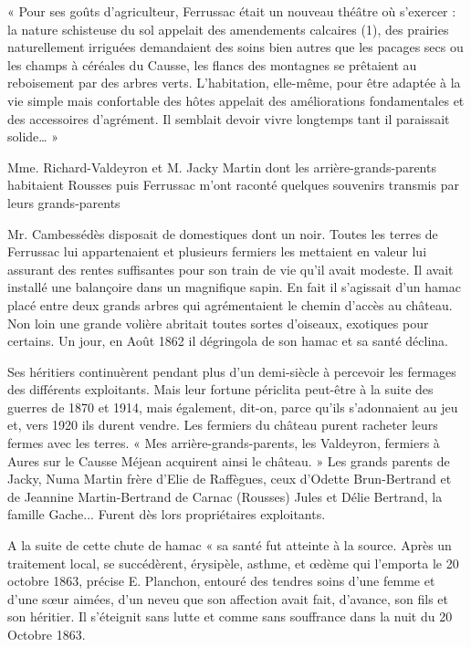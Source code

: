 
« Pour ses goûts d’agriculteur, Ferrussac était un nouveau théâtre où s’exercer : la nature
schisteuse du sol appelait des amendements calcaires (1), des prairies naturellement irriguées
demandaient des soins bien autres que les pacages secs ou les champs à céréales du Causse,
les flancs des montagnes se prêtaient au reboisement par des arbres verts.
L’habitation, elle-même, pour être adaptée à la vie simple mais confortable des hôtes appelait
des améliorations fondamentales et des accessoires d’agrément. Il semblait devoir vivre
longtemps tant il paraissait solide… »

Mme. Richard-Valdeyron et M. Jacky Martin dont les arrière-grands-parents habitaient Rousses puis Ferrussac
m’ont raconté quelques souvenirs transmis par leurs grands-parents

\begin{tcolorbox}
Mr. Cambessédès disposait de domestiques dont un noir. Toutes les terres de Ferrussac lui appartenaient et
plusieurs fermiers les mettaient en valeur lui assurant des rentes suffisantes pour son train de vie qu’il avait
modeste. Il avait installé une balançoire dans un magnifique sapin. En fait il s’agissait d’un hamac placé entre
deux grands arbres qui agrémentaient le chemin d’accès au château. Non loin une grande volière abritait
toutes sortes d’oiseaux, exotiques pour certains. Un jour, en Août 1862 il dégringola de son hamac et sa santé
déclina.

Ses héritiers continuèrent pendant plus d’un demi-siècle à percevoir les fermages des différents exploitants. Mais
leur fortune périclita peut-être à la suite des guerres de 1870 et 1914, mais également, dit-on, parce qu’ils
s’adonnaient au jeu et, vers 1920 ils durent vendre.
Les fermiers du château purent racheter leurs fermes avec les terres.
« Mes arrière-grands-parents, les Valdeyron, fermiers à Aures sur le Causse Méjean acquirent ainsi le château. »
Les grands parents de Jacky, Numa Martin frère d’Elie de Raffègues, ceux d’Odette Brun-Bertrand et de
Jeannine Martin-Bertrand de Carnac (Rousses) Jules et Délie Bertrand, la famille Gache... Furent dès lors
propriétaires exploitants.
\end{tcolorbox}

A la suite de cette chute de hamac « sa santé fut atteinte à la source. Après un traitement
local, se succédèrent, érysipèle, asthme, et œdème qui l’emporta le 20 octobre 1863, précise
E. Planchon, entouré des tendres soins d’une femme et d’une sœur aimées, d’un neveu que
son affection avait fait, d’avance, son fils et son héritier. Il s’éteignit sans lutte et comme sans
souffrance dans la nuit du 20 Octobre 1863.

